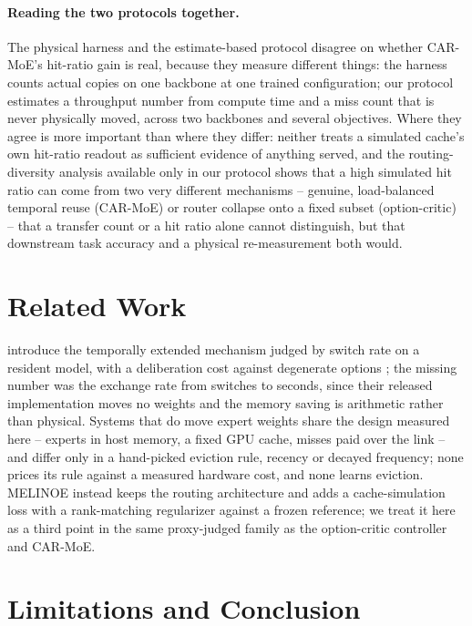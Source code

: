 \documentclass{article}
\begin{document}
\paragraph{Reading the two protocols together.} The physical harness and the estimate-based
protocol disagree on whether CAR-MoE's hit-ratio gain is real, because they measure different
things: the harness counts actual copies on one backbone at one trained configuration; our
protocol estimates a throughput number from compute time and a miss count that is never
physically moved, across two backbones and several objectives. Where they agree is more
important than where they differ: neither treats a simulated cache's own hit-ratio readout as
sufficient evidence of anything served, and the routing-diversity analysis available only in
our protocol shows that a high simulated hit ratio can come from two very different
mechanisms -- genuine, load-balanced temporal reuse (CAR-MoE) or router collapse onto a fixed
subset (option-critic) -- that a transfer count or a hit ratio alone cannot distinguish, but
that downstream task accuracy and a physical re-measurement both would.

\section{Related Work}

\citet{shen2026temporal} introduce the temporally extended mechanism judged by switch rate on
a resident model, with a deliberation cost against degenerate options
\citep{harb2018waiting,bacon2017optioncritic}; the missing number was the exchange rate from
switches to seconds, since their released implementation moves no weights and the memory
saving is arithmetic rather than physical. Systems that do move expert weights share the
design measured here -- experts in host memory, a fixed GPU cache, misses paid over the link --
and differ only in a hand-picked eviction rule, recency \citep{eliseev2023offloading} or
decayed frequency; none prices its rule against a measured hardware cost, and none learns
eviction. MELINOE \citep{raje2026melinoe} instead keeps the routing architecture and adds a
cache-simulation loss with a rank-matching regularizer against a frozen reference; we treat it
here as a third point in the same proxy-judged family as the option-critic controller and
CAR-MoE.

\section{Limitations and Conclusion}
\end{document}
